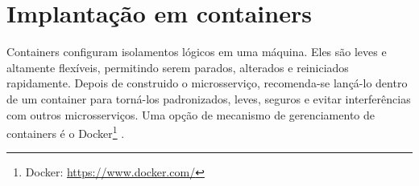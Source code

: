 


\section{Implantação em containers}

Containers configuram isolamentos lógicos em uma máquina. Eles são leves e altamente flexíveis, permitindo serem parados, alterados e reiniciados rapidamente. Depois de construido o microsserviço, recomenda-se lançá-lo dentro de um container para torná-los padronizados, leves, seguros e evitar interferências com outros microsserviços. Uma opção de mecanismo de gerenciamento de containers é o Docker\footnote{Docker: \url{https://www.docker.com/}} \cite{oracle_microservices}.



